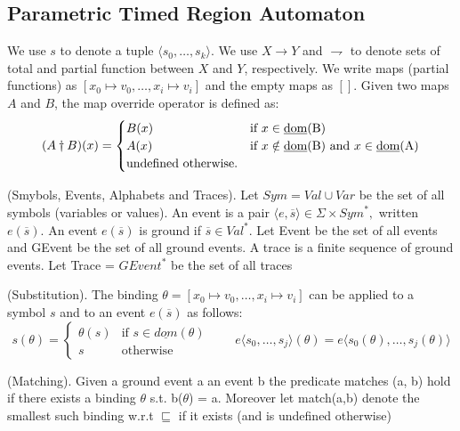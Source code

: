 		\subsection{Parametric Timed Region Automaton}
			
			
			We use $s$ to denote a tuple $\langle s_0,\dots,s_k \rangle$. We use $X \rightarrow Y$ and $\rightharpoondown$ to denote sets of total and partial function between
			$X$ and $Y$, respectively. We write maps (partial functions) as $[x_0 \mapsto v_0,\dots,x_i \mapsto v_i]$ and the empty maps as $[]$. Given two maps $A$ and $B$,
			the map override operator is defined as:
				\[
				 (A \dagger B)(x) = 
				  \begin{cases} 
				   B(x) & \text{if } x \in \text{\underline{dom}(B)} \\
				   A(x) & \text{if } x \notin \text{\underline{dom}(B)} \text{ and } x \in \text{\underline{dom}(A)} \\
				   \text{undefined otherwise.}
				  \end{cases}
				\]
 			
			\begin{dfn}
				(Smybols, Events, Alphabets and Traces).
				Let $\mathit{Sym} = \mathit{Val} \cup \mathit{Var}$ be the set of all symbols (variables or values).
				An event is a pair $\langle e, \overline{s} \rangle \in \Sigma \times \mathit{Sym}^\ast,$ written $e(\overline{s})$.
				An event $e(\overline{s})$ is ground if $\overline{s} \in \mathit{Val}^\ast$.
				Let Event be the set of all events and GEvent be the set of all ground events.
				A trace is a finite sequence of ground events.
				Let Trace = $GEvent^\ast$ be the set of all traces
			\end{dfn}
			
			\begin{dfn}
				(Substitution).
				The binding $\theta = [x_0 \mapsto v_0, \dots, x_i \mapsto v_i]$ can be applied to a symbol $s$ and to an event
				$e(\overline{s})$ as follows: 
				\[
				 s(\theta) = 
				  \begin{cases} 
				   \theta(s) & \text{if } s \in \underline{dom}(\theta) \\
				   s & \text{otherwise}
				  \end{cases}
				  \qquad e \langle s_0,\ldots,s_j \rangle (\theta) = e \langle s_0(\theta),\ldots,s_j(\theta) \rangle
				\]
			\end{dfn}
			
			\begin{dfn}
				(Matching).
				Given a ground event a an event b the predicate matches (a, b) hold if there exists a binding $\theta$ s.t. b($\theta$) = a.
				Moreover let match(a,b) denote the smallest such binding w.r.t $\sqsubseteq$ if it exists (and is undefined otherwise)
			\end{dfn}
			
